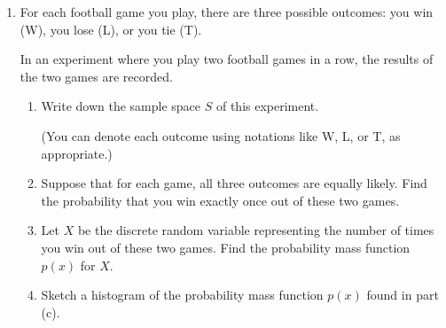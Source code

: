 \documentclass[11pt]{article}
\begin{document}
\begin{enumerate}
\begin{enumerate}
\begin{enumerate}
        \vfill
    \end{enumerate}

    \item Write the following sum in summation notation. 

    \[\dfrac{\sqrt[3]{4}}{3}+\dfrac{\sqrt[3]{9}}{5}+\dfrac{\sqrt[3]{16}}{7}+\dfrac{\sqrt[3]{25}}{9}\] 

    \vfill
\end{enumerate}


\newpage


\item For each football game you play, there are three possible outcomes: you win (W), you lose (L), or you tie (T).

In an experiment where you play two football games in a row, the results of the two games are recorded.

\begin{enumerate}
    \item Write down the sample space $S$ of this experiment.

    (You can denote each outcome using notations like W, L, or T, as appropriate.)
    
    \vfill

    \item Suppose that for each game, all three outcomes are equally likely. Find the probability that you win exactly once out of these two games.

    \vfill

    \item Let $X$ be the discrete random variable representing the number of times you win out of these two games. Find the probability mass function $p(x)$ for $X$.

    \vfill

    \item Sketch a histogram of the probability mass function $p(x)$ found in part (c).


\end{enumerate}
\end{enumerate}
\end{document}
